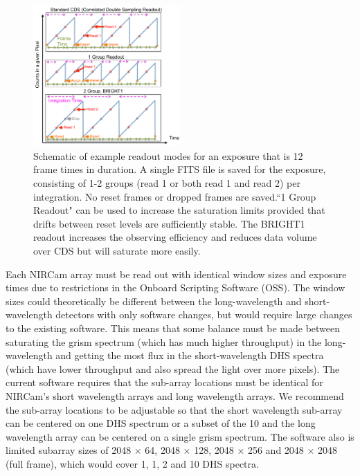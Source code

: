 \documentclass[iop]{emulateapj}
\begin{document}
\begin{figure}
\centering
\includegraphics[width=0.5\textwidth]{readout_schematic.pdf}
\caption{Schematic of example readout modes for an exposure that is 12 frame times in duration.
A single FITS file is saved for the exposure, consisting of 1-2 groups (read 1 or both read 1 and read 2) per integration.
No reset frames or dropped frames are saved.``1 Group Readout" can be used to increase the saturation limits provided that drifts between reset levels are sufficiently stable.
The BRIGHT1 readout increases the observing efficiency and reduces data volume over CDS but will saturate more easily.}\label{fig:readout}
\end{figure}

Each NIRCam array must be read out with identical window sizes and exposure times due to restrictions in the Onboard Scripting Software (OSS).
The window sizes could theoretically be different between the long-wavelength and short-wavelength detectors with only software changes, but would require large changes to the existing software.
This means that some balance must be made between saturating the grism spectrum (which has much higher throughput) in the long-wavelength and getting the most flux in the short-wavelength DHS spectra (which have lower throughput and also spread the light over more pixels).
The current software requires that the sub-array locations must be identical for NIRCam's short wavelength arrays and long wavelength arrays.
We recommend  the sub-array locations to be adjustable so that the short wavelength sub-array can be centered on one DHS spectrum or a subset of the 10 and the long wavelength array can be centered on a single grism spectrum.
The software also is limited subarray sizes of 2048 $\times$ 64, 2048 $\times$ 128, 2048 $\times$ 256 and 2048 $\times$ 2048 (full frame), which would cover 1, 1, 2 and 10 DHS spectra.
\end{document}
